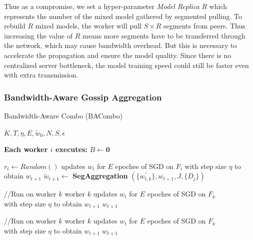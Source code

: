 Thus as a compromise, we set a hyper-parameter \textit{Model Replica} $R$ which represents the number of the mixed model gathered by segmented pulling. To rebuild $R$ mixed models, the worker will pull $S \times R$ segments from peers. Thus increasing the value of $R$ means more segments have to be transferred through the network, which may cause bandwidth overhead. But this is necessary to accelerate the propagation and ensure the model quality. Since there is no centralized server bottleneck, the model training speed could still be faster even with extra transmission.


\subsubsection{Bandwidth-Aware Gossip Aggregation}
\begin{algorithm}[!t]

\caption{Bandwidth-Aware Combo (BACombo)}

\renewcommand{\algorithmicrequire}{\textbf{Input:}}
\renewcommand{\algorithmicensure}{\textbf{Output:}}


\begin{algorithmic}[1]
\REQUIRE $K, T, \eta, E, \widetilde{w}_0, N, S, \epsilon $

\STATE \textbf{Each worker $i$ executes:}
\STATE $ B \leftarrow \mathbf{0} $

    \STATE $r_t \leftarrow Random()$ 
    \STATE updates ${ w}_{t}$ for $E$ epoches of SGD on $F_i$  with step size $\eta$ to obtain ${ w}_{t+1}$
    \ENDIF
    \STATE $\widetilde{{w}}_{t+1} \leftarrow$ \textbf{SegAggregation} $(\{{w}_{t,k}^\prime\},{{w}}_{t+1},J ,\{D_j\})$
\ENDFOR
\item[]

\STATE {}//Run on worker $k$
{
    \STATE \quad worker $k$ updates $w_t$ for $E$ epoches of SGD on $F_k$ \\ \quad with step size $\eta$ to obtain $w_{t+1}$
\RETURN $w_{t+1}$ 
}

\item[]

\STATE {}//Run on worker $k$
{
    \STATE \quad worker $k$ updates $w_t$ for $E$ epoches of SGD on $F_k$ \\ \quad with step size $\eta$ to obtain $w_{t+1}$
\RETURN $w_{t+1}$ 
}

\end{algorithmic}	\label{BACombo} 
\end{algorithm}

